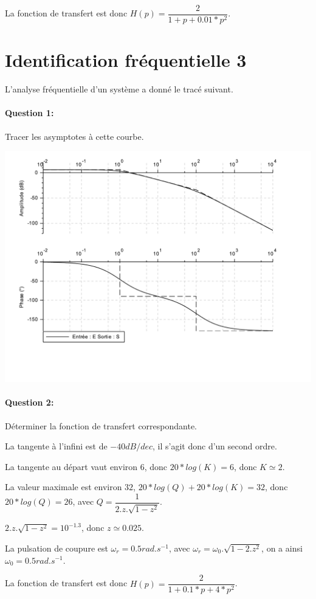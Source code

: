 La fonction de transfert est donc $H(p)=\dfrac{2}{1+p+0.01*p^2}$.

\newpage

\section{Identification fréquentielle 3}

L'analyse fréquentielle d'un système a donné le tracé suivant.

\paragraph{Question 1:} Tracer les asymptotes à cette courbe.

\begin{center}
 \includegraphics[width=0.8\linewidth]{img/Bode4_c}
\end{center} 

\paragraph{Question 2:} Déterminer la fonction de transfert correspondante.

La tangente à l'infini est de $-40dB/dec$, il s'agit donc d'un second ordre.

La tangente au départ vaut environ $6$, donc $20*log(K)=6$, donc $K\simeq 2$.

La valeur maximale est environ $32$, $20*log(Q)+20*log(K)=32$, donc $20*log(Q)=26$, avec $Q=\dfrac{1}{2.z.\sqrt{1-z^2}}$.

$2.z.\sqrt{1-z^2}=10^{-1.3}$, donc $z\simeq 0.025$.

La pulsation de coupure est $\omega_r=0.5rad.s^{-1}$, avec $\omega_r=\omega_0.\sqrt{1-2.z^2}$, on a ainsi $\omega_0=0.5rad.s^{-1}$.

La fonction de transfert est donc $H(p)=\dfrac{2}{1+0.1*p+4*p^2}$.


